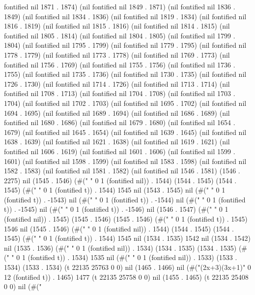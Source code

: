 fontified nil 1871 . 1874) (nil fontified nil 1849 . 1871) (nil fontified nil 1836 . 1849) (nil fontified nil 1834 . 1836) (nil fontified nil 1819 . 1834) (nil fontified nil 1816 . 1819) (nil fontified nil 1815 . 1816) (nil fontified nil 1814 . 1815) (nil fontified nil 1805 . 1814) (nil fontified nil 1804 . 1805) (nil fontified nil 1799 . 1804) (nil fontified nil 1795 . 1799) (nil fontified nil 1779 . 1795) (nil fontified nil 1778 . 1779) (nil fontified nil 1773 . 1778) (nil fontified nil 1769 . 1773) (nil fontified nil 1756 . 1769) (nil fontified nil 1755 . 1756) (nil fontified nil 1736 . 1755) (nil fontified nil 1735 . 1736) (nil fontified nil 1730 . 1735) (nil fontified nil 1726 . 1730) (nil fontified nil 1714 . 1726) (nil fontified nil 1713 . 1714) (nil fontified nil 1708 . 1713) (nil fontified nil 1704 . 1708) (nil fontified nil 1703 . 1704) (nil fontified nil 1702 . 1703) (nil fontified nil 1695 . 1702) (nil fontified nil 1694 . 1695) (nil fontified nil 1689 . 1694) (nil fontified nil 1686 . 1689) (nil fontified nil 1680 . 1686) (nil fontified nil 1679 . 1680) (nil fontified nil 1654 . 1679) (nil fontified nil 1645 . 1654) (nil fontified nil 1639 . 1645) (nil fontified nil 1638 . 1639) (nil fontified nil 1621 . 1638) (nil fontified nil 1619 . 1621) (nil fontified nil 1606 . 1619) (nil fontified nil 1601 . 1606) (nil fontified nil 1599 . 1601) (nil fontified nil 1598 . 1599) (nil fontified nil 1583 . 1598) (nil fontified nil 1582 . 1583) (nil fontified nil 1581 . 1582) (nil fontified nil 1546 . 1581) (1546 . 2275) nil (1545 . 1546) (#(" " 0 1 (fontified nil)) . 1544) (1544 . 1545) (1544 . 1545) (#(" " 0 1 (fontified t)) . 1544) 1545 nil (1543 . 1545) nil (#("
" 0 1 (fontified t)) . -1543) nil (#("
" 0 1 (fontified t)) . -1544) nil (#("
" 0 1 (fontified t)) . -1545) nil (#(" " 0 1 (fontified t)) . -1546) nil (1546 . 1547) (#(" " 0 1 (fontified nil)) . 1545) (1545 . 1546) (1545 . 1546) (#(" " 0 1 (fontified t)) . 1545) 1546 nil (1545 . 1546) (#(" " 0 1 (fontified nil)) . 1544) (1544 . 1545) (1544 . 1545) (#(" " 0 1 (fontified t)) . 1544) 1545 nil (1534 . 1535) 1542 nil (1534 . 1542) nil (1535 . 1536) (#(" " 0 1 (fontified nil)) . 1534) (1534 . 1535) (1534 . 1535) (#(" " 0 1 (fontified t)) . 1534) 1535 nil (#(" " 0 1 (fontified nil)) . 1533) (1533 . 1534) (1533 . 1534) (t 22135 25763 0 0) nil (1465 . 1466) nil (#("(2x+3)(3x+1)" 0 12 (fontified t)) . 1465) 1477 (t 22135 25758 0 0) nil (1455 . 1465) (t 22135 25408 0 0) nil (#("%
